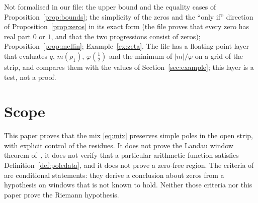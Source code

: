 \documentclass[11pt]{amsart}
\theoremstyle{definition}
\theoremstyle{remark}
\begin{document}
Not formalised in our file: the upper bound and the equality cases of
Proposition~\ref{prop:bounds}; the simplicity of the zeros and the ``only if'' direction of
Proposition~\ref{prop:zeros} in its exact form (the file proves that every zero has real part $0$
or $1$, and that the two progressions consist of zeros); Proposition~\ref{prop:mellin};
Example~\ref{ex:zeta}. The file has a floating-point layer that evaluates $q$, $m(\rho_1)$,
$\varphi(\tfrac12)$ and the minimum of $|m|/\varphi$ on a grid of the strip, and compares them with
the values of Section~\ref{sec:example}; this layer is a test, not a proof.

\section{Scope}\label{sec:scope}

This paper proves that the mix \eqref{eq:mix} preserves simple poles in the open strip, with
explicit control of the residues. It does not prove the Landau window theorem of~\cite{upstream},
it does not verify that a particular arithmetic function satisfies Definition~\ref{def:poledata},
and it does not prove a zero-free region. The criteria of
\cite{Crossley-transfer,Crossley-prime} are conditional statements: they derive a conclusion about
zeros from a hypothesis on windows that is not known to hold. Neither those criteria nor this paper
prove the Riemann hypothesis.
\end{document}
